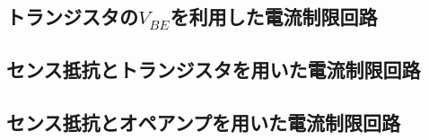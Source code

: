 \documentclass[uplatex,dvipdfmx,a4j,10pt]{jsarticle}
\begin{document}
\subsection{トランジスタの$V_{BE}$を利用した電流制限回路}
\subsection{センス抵抗とトランジスタを用いた電流制限回路}
\subsection{センス抵抗とオペアンプを用いた電流制限回路}


\clearpage

\end{document}
